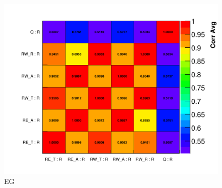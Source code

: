 \begin{figure}[]
\centering
\includegraphics[width=\textwidth]{Avg_Recon_CorrelationMatrix_R_R}
\caption{EG}
\label{fig:}
\end{figure}



